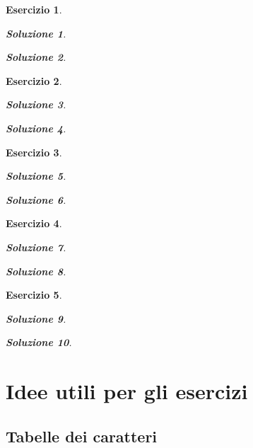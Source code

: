\documentclass[a4paper]{article}
\theoremstyle{break}
\newtheorem{ex}{{ \Large Esercizio} }
\theoremstyle{plain}
\newtheorem{sol}{Soluzione}[ex]
\begin{document}
\begin{ex}


\begin{sol}

\end{sol}

\begin{sol}

\end{sol}


\end{ex}

\begin{ex}


\begin{sol}

\end{sol}

\begin{sol}

\end{sol}


\end{ex}

\begin{ex}


\begin{sol}

\end{sol}

\begin{sol}

\end{sol}


\end{ex}

\begin{ex}


\begin{sol}

\end{sol}

\begin{sol}

\end{sol}


\end{ex}

\begin{ex}


\begin{sol}

\end{sol}

\begin{sol}

\end{sol}


\end{ex}

\newpage
\section*{Idee utili per gli esercizi}
\subsection*{Tabelle dei caratteri}
\end{document}
